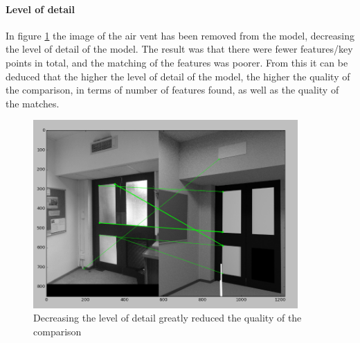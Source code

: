 \documentclass[11pt,a4paper]{report}
\begin{document}
				\paragraph{Level of detail}
					In figure \ref{fig:level_of_detail_results} the image of the air vent has been removed from the model, decreasing the level of detail of the model. The result was that there were fewer features/key points in total, and the matching of the features was poorer. From this it can be deduced that the higher the level of detail of the model, the higher the quality of the comparison, in terms of number of features found, as well as the quality of the matches.
					\begin{figure}[H]
						\centering
						\includegraphics[width=0.9\textwidth]{level_of_detail_results}
						\caption{Decreasing the level of detail greatly reduced the quality of the comparison}
						\label{fig:level_of_detail_results}
					\end{figure}
\end{document}

